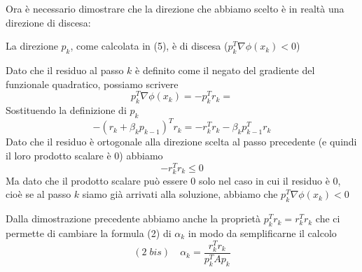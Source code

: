 Ora \`e necessario dimostrare che la direzione che abbiamo scelto \`e in
realtà una direzione di discesa:

\begin{theo} La direzione $p_{k}$, come calcolata in (5), \`e di discesa
($p_{k}^{T}\nabla \phi(x_{k})<0$)
\end{theo}
\begin{thproof} Dato che il residuo al passo $k$ \`e definito come il
negato del gradiente del funzionale quadratico, possiamo scrivere
 $$ p_{k}^{T} \nabla \phi(x_{k}) = 
  -p_{k}^{T} r_{k} =
$$
Sostituendo la definizione di $p_{k}$
$$
  - (r_{k} + \beta_{k} p_{k-1})^{T} r_{k} = - r_{k}^{T} r_{k} -
\beta_{k} p_{k-1}^{T} r_{k}
$$
Dato che il residuo \`e ortogonale alla direzione scelta al passo
precedente (e quindi il loro prodotto scalare \`e 0) abbiamo
$$
-r_{k}^{T}r_{k} \leq 0
$$
Ma dato che il prodotto scalare può essere 0 solo nel caso in cui il
residuo \`e 0, cio\`e se al passo $k$ siamo già arrivati alla soluzione,
abbiamo che $ p_{k}^{T} \nabla \phi(x_{k}) < 0$
\end{thproof}

Dalla dimostrazione precedente abbiamo anche la proprietà
$p_{k}^{T}r_{k}=r_{k}^{T}r_{k}$ che ci permette di cambiare la formula
(2) di $\alpha_{k}$ in modo da semplificarne il calcolo
$$
(2\; bis) \quad \alpha_{k}=\frac{r_{k}^{T}r_{k}}{p_{k}^{T}Ap_{k}}
$$

